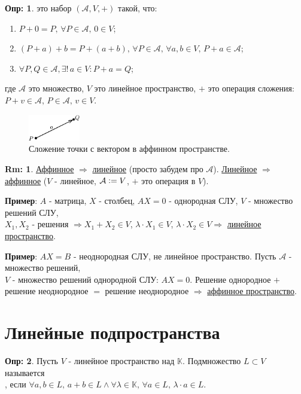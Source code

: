 \documentclass[12pt]{article}
\theoremstyle{definition}
\newtheorem{defn}{Опр:}
\newtheorem{rem}{Rm:}
\begin{document}
\begin{defn}
	 это набор $(\mathcal{A}, V, +)$  такой, что:
	\begin{enumerate}[label={(\arabic*)}]
		\item $P + 0 = P, \, \forall P \in \mathcal{A}, \, 0 \in V$;
		\item $(P + a) + b = P + (a + b), \, \forall P \in \mathcal{A},\, \forall a,b \in V,\, P + a \in \mathcal{A}$;
		\item $\forall P,Q \in \mathcal{A}, \exists! \, a \in V \colon P + a = Q$;
	\end{enumerate}
	где $\mathcal{A}$ это множество, $V$ это линейное пространство, $+$ это операция сложения: $P + v \in \mathcal{A}, \, P \in \mathcal{A}, \, v \in V$.
\end{defn}
\begin{figure}[H]
	\centering
	\includegraphics[width=0.2\textwidth]{1_1.eps}
	\caption{Сложение точки с вектором в аффинном пространстве.}
	\label{1_1}
\end{figure}
\begin{rem}
	\uline{Аффинное} $\Rightarrow$ \uline{линейное} (просто забудем про $\mathcal{A}$). \uline{Линейное} $\Rightarrow$ \uline{аффинное} ($V$ - линейное, $\mathcal{A} \vcentcolon= V$, $+$ это операция в $V$).
\end{rem}

\textbf{Пример}: $A$ - матрица, $X$ - столбец, $AX = 0$ - однородная СЛУ, $V$ - множество решений СЛУ,\\
$X_1, X_2$ - решения $\Rightarrow X_1 + X_2 \in V$, $\lambda{\cdot}X_1 \in V$, $\lambda{\cdot}X_2 \in V \Rightarrow$ \uline{линейное пространство}.

\textbf{Пример}: $AX = B$ - неоднородная СЛУ, не линейное пространство. Пусть $\mathcal{A}$ - множество решений,\\
$V$ - множество решений однородной СЛУ: $AX = 0$. Решение однородное $+$ решение неоднородное $=$ решение неоднородное $\Rightarrow$ \uline{аффинное пространство}.

\section*{Линейные подпространства}

\begin{defn}
	Пусть $V$ - линейное пространство над $\mathbb{K}$. Подмножество $L \subset V$ называется \\ 
	, если $\forall a,b \in L, \, a + b \in L \wedge \forall \lambda \in \mathbb{K}, \, \forall a \in L, \, \lambda{\cdot}a \in L$.
\end{defn}
\end{document}
